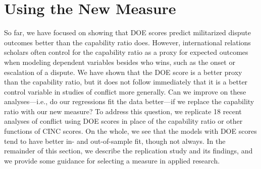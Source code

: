 \section{Using the New Measure}
\label{sec:replications}

So far, we have focused on showing that DOE scores predict militarized dispute outcomes better than the capability ratio does.
However, international relations scholars often control for the capability ratio as a proxy for expected outcomes when modeling dependent variables besides who wins, such as the onset or escalation of a dispute.
We have shown that the DOE score is a better proxy than the capability ratio, but it does not follow immediately that it is a better control variable in studies of conflict more generally.
Can we improve on these analyses---i.e., do our regressions fit the data better---if we replace the capability ratio with our new measure?
To address this question, we replicate 18 recent analyses of conflict using DOE scores in place of the capability ratio or other functions of CINC scores.
On the whole, we see that the models with DOE scores tend to have better in- and out-of-sample fit, though not always.
In the remainder of this section, we describe the replication study and its findings, and we provide some guidance for selecting a measure in applied research.



